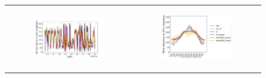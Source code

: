 \begin{figure}[hbtp]
\begin{tabular}{cc}
        \begin{subfigure}[t]{0.5\textwidth}
            \caption{}
            \includegraphics[width=\textwidth]{images/chap5/SOP_TS_DC/time_series_cendrosa_wind_direction_10m.png}
        \end{subfigure} &
        \begin{subfigure}[t]{0.5\textwidth}
            \caption{}
            \includegraphics[width=\textwidth]{images/chap5/SOP_TS_DC/diurnal_cycle_cendrosa_wind_direction_10m.png}
        \end{subfigure} \\


\end{tabular}
\end{figure}
